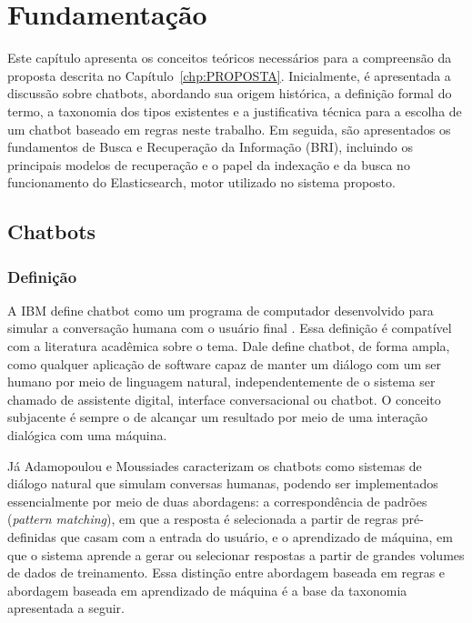 \chapter{Fundamentação}\label{chp:FUNDAMENTACAO}

Este capítulo apresenta os conceitos teóricos necessários para a compreensão da proposta descrita no Capítulo~\ref{chp:PROPOSTA}. Inicialmente, é apresentada a discussão sobre chatbots, abordando sua origem histórica, a definição formal do termo, a taxonomia dos tipos existentes e a justificativa técnica para a escolha de um chatbot baseado em regras neste trabalho. Em seguida, são apresentados os fundamentos de Busca e Recuperação da Informação (BRI), incluindo os principais modelos de recuperação e o papel da indexação e da busca no funcionamento do Elasticsearch, motor utilizado no sistema proposto.

\section{Chatbots}

\subsection{Definição}

A IBM define chatbot como um programa de computador desenvolvido para simular a conversação humana com o usuário final \cite{IBMChatbots}. Essa definição é compatível com a literatura acadêmica sobre o tema. Dale \cite{dale2016chatbots} define chatbot, de forma ampla, como qualquer aplicação de software capaz de manter um diálogo com um ser humano por meio de linguagem natural, independentemente de o sistema ser chamado de assistente digital, interface conversacional ou chatbot. O conceito subjacente é sempre o de alcançar um resultado por meio de uma interação dialógica com uma máquina.

Já Adamopoulou e Moussiades \cite{adamopoulou2020chatbots} caracterizam os chatbots como sistemas de diálogo natural que simulam conversas humanas, podendo ser implementados essencialmente por meio de duas abordagens: a correspondência de padrões (\textit{pattern matching}), em que a resposta é selecionada a partir de regras pré-definidas que casam com a entrada do usuário, e o aprendizado de máquina, em que o sistema aprende a gerar ou selecionar respostas a partir de grandes volumes de dados de treinamento. Essa distinção entre abordagem baseada em regras e abordagem baseada em aprendizado de máquina é a base da taxonomia apresentada a seguir.

